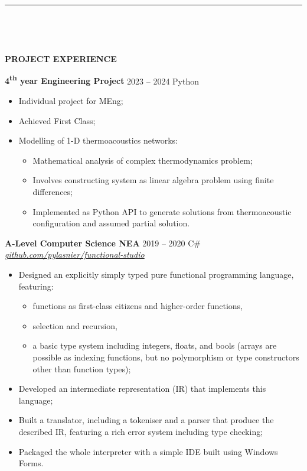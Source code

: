 \documentclass[
  11pt,
  a4paper,
]{article}
\providecommand{\tightlist}{%
  \setlength{\itemsep}{0pt}\setlength{\parskip}{0pt}}
\newcommand{\itemspace}{0.8ex}
\newcommand{\ruledheader}[2]{%
\begingroup
\setlength{\fboxsep}{0pt}%
\colorbox{#1}{%
\parbox[b][1.2ex][t]{35mm}{\begin{tiny}\ \end{tiny}}}%
\parbox[b][1.2ex][t]{5mm}{\begin{tiny}\ \end{tiny}}%
\uppercase{\textbf{#2}}
\endgroup}
\begin{document}
\begin{Large}

\vspace{-1.5ex}\rule{\textwidth}{0.8pt}\vspace{2ex}

\ruledheader{cyan!50!teal}{Project experience}\end{Large}

\vspace{\itemspace}

\textbf{4\textsuperscript{th} year Engineering Project} \textbar{} 2023
– 2024 \textbar{} Python

\begin{itemize}
\tightlist
\item
  Individual project for MEng;
\item
  Achieved First Class;
\item
  Modelling of 1-D thermoacoustics networks:

  \begin{itemize}
  \tightlist
  \item
    Mathematical analysis of complex thermodynamics problem;
  \item
    Involves constructing system as linear algebra problem using finite
    differences;
  \item
    Implemented as Python API to generate solutions from thermoacoustic
    configuration and assumed partial solution.
  \end{itemize}
\end{itemize}

\vspace{\itemspace}

\textbf{A-Level Computer Science NEA} \textbar{} 2019 – 2020 \textbar{}
C\# \textbar{}
\href{https://github.com/pylasnier/functional-studio}{\emph{github.com/pylasnier/functional-studio}}

\begin{itemize}
\tightlist
\item
  Designed an explicitly simply typed pure functional programming
  language, featuring:

  \begin{itemize}
  \tightlist
  \item
    functions as first-class citizens and higher-order functions,
  \item
    selection and recursion,
  \item
    a basic type system including integers, floats, and bools (arrays
    are possible as indexing functions, but no polymorphism or type
    constructors other than function types);
  \end{itemize}
\item
  Developed an intermediate representation (IR) that implements this
  language;
\item
  Built a translator, including a tokeniser and a parser that produce
  the described IR, featuring a rich error system including type
  checking;
\item
  Packaged the whole interpreter with a simple IDE built using Windows
  Forms.
\end{itemize}
\end{document}
